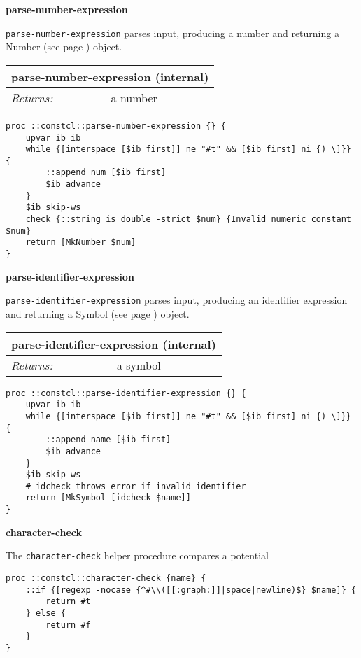 \documentclass{report}
\begin{document}
\textbf{parse-number-expression}


\texttt{parse-number-expression} parses input, producing a number and returning a Number (see page \pageref{numbers}) object.

\begin{tabular}{ |l l| }
\hline
\multicolumn{2}{|l|}{parse-number-expression (internal)} \\
\hline
\textit{Returns:} & a number \\
\hline
\end{tabular}

\noindent\makebox[\linewidth]{\rule{\linewidth}{0.4pt}}
\begin{lstlisting}
proc ::constcl::parse-number-expression {} {
    upvar ib ib
    while {[interspace [$ib first]] ne "#t" && [$ib first] ni {) \]}} {
        ::append num [$ib first]
        $ib advance
    }
    $ib skip-ws
    check {::string is double -strict $num} {Invalid numeric constant $num}
    return [MkNumber $num]
}
\end{lstlisting}
\noindent\makebox[\linewidth]{\rule{\linewidth}{0.4pt}}

\textbf{parse-identifier-expression}


\texttt{parse-identifier-expression} parses input, producing an identifier expression and returning a Symbol (see page \pageref{symbols}) object.

\begin{tabular}{ |l l| }
\hline
\multicolumn{2}{|l|}{parse-identifier-expression (internal)} \\
\hline
\textit{Returns:} & a symbol \\
\hline
\end{tabular}

\noindent\makebox[\linewidth]{\rule{\linewidth}{0.4pt}}
\begin{lstlisting}
proc ::constcl::parse-identifier-expression {} {
    upvar ib ib
    while {[interspace [$ib first]] ne "#t" && [$ib first] ni {) \]}} {
        ::append name [$ib first]
        $ib advance
    }
    $ib skip-ws
    # idcheck throws error if invalid identifier
    return [MkSymbol [idcheck $name]]
}
\end{lstlisting}
\noindent\makebox[\linewidth]{\rule{\linewidth}{0.4pt}}

\textbf{character-check}


The \texttt{character-check} helper procedure compares a potential

\noindent\makebox[\linewidth]{\rule{\linewidth}{0.4pt}}
\begin{lstlisting}
proc ::constcl::character-check {name} {
    ::if {[regexp -nocase {^#\\([[:graph:]]|space|newline)$} $name]} {
        return #t
    } else {
        return #f
    }
}
\end{lstlisting}
\noindent\makebox[\linewidth]{\rule{\linewidth}{0.4pt}}
\end{document}
